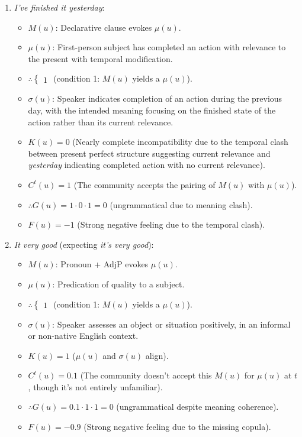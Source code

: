 \begin{enumerate}
    \item \textit{I've finished it yesterday}:
    \begin{itemize}
        \item \(M(u)\): Declarative clause evokes \(\mu(u)\).
        \item \(\mu(u)\): First-person subject has completed an action with relevance to the present with temporal modification.
        \item \(\therefore \begin{cases} 1 \end{cases}\) (condition 1: \(M(u)\) yields a \(\mu(u)\)).
        \item \(\sigma(u)\): Speaker indicates completion of an action during the previous day, with the intended meaning focusing on the finished state of the action rather than its current relevance.
        \item \(K(u) = 0\) (Nearly complete incompatibility due to the temporal clash between present perfect structure suggesting current relevance and \textit{yesterday} indicating completed action with no current relevance).
        \item \(C^t(u) = 1\) (The community accepts the pairing of \(M(u)\) with \(\mu(u)\)).
        \item \(\therefore G(u) = 1 \cdot 0 \cdot 1 = 0\) (ungrammatical due to meaning clash).
        \item \(F(u) = -1\) (Strong negative feeling due to the temporal clash).
    \end{itemize}

    \item \textit{It very good} (expecting \textit{it's very good}):
    \begin{itemize}
        \item \(M(u)\): Pronoun + AdjP evokes \(\mu(u)\).
        \item \(\mu(u)\): Predication of quality to a subject.
        \item \(\therefore \begin{cases} 1 \end{cases}\) (condition 1: \(M(u)\) yields a \(\mu(u)\)).
        \item \(\sigma(u)\): Speaker assesses an object or situation positively, in an informal or non-native English context.
        \item \(K(u) = 1\) (\(\mu(u)\) and \(\sigma(u)\) align).
        \item \(C^t(u) = 0.1\) (The community doesn't accept this \(M(u)\) for \(\mu(u)\) at $t$, though it's not entirely unfamiliar).
        \item \(\therefore G(u) = 0.1 \cdot 1 \cdot 1 = 0\) (ungrammatical despite meaning coherence).
        \item \(F(u) = -0.9\) (Strong negative feeling due to the missing copula).
    \end{itemize}


\end{enumerate}
